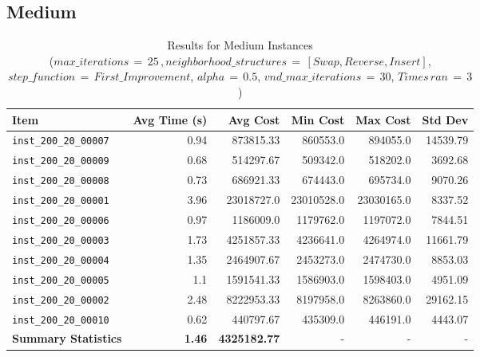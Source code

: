 \documentclass{article}
\begin{document}
\subsection*{Medium}
\begin{table}[H]
	\centering 
      \caption{Results for Medium Instances \\($max\_iterations \,{=}\, 25\,, neighborhood\_structures \,{=}\, [Swap, Reverse, Insert]$, $step\_function \,{=}\, First\_Improvement$, $alpha \,{=}\, 0.5$, $vnd\_max\_iterations \,{=}\, 30$, $Times\, ran \,{=}\, 3$)}
    \hspace*{-2cm}
	\begin{tabular}{lrrrrr} 
		\toprule 
		\textbf{Item} & \textbf{Avg Time (s)} & \textbf{Avg Cost} & \textbf{Min Cost} & \textbf{Max Cost} & \textbf{Std Dev} \\
		\midrule 
		\texttt{inst\_200\_20\_00007} & 0.94 & 873815.33 & 860553.0 & 894055.0 & 14539.79 \\ \texttt{inst\_200\_20\_00009} & 0.68 & 514297.67 & 509342.0 & 518202.0 & 3692.68 \\ \texttt{inst\_200\_20\_00008} & 0.73 & 686921.33 & 674443.0 & 695734.0 & 9070.26 \\ \texttt{inst\_200\_20\_00001} & 3.96 & 23018727.0 & 23010528.0 & 23030165.0 & 8337.52 \\ \texttt{inst\_200\_20\_00006} & 0.97 & 1186009.0 & 1179762.0 & 1197072.0 & 7844.51 \\ \texttt{inst\_200\_20\_00003} & 1.73 & 4251857.33 & 4236641.0 & 4264974.0 & 11661.79 \\ \texttt{inst\_200\_20\_00004} & 1.35 & 2464907.67 & 2453273.0 & 2474730.0 & 8853.03 \\ \texttt{inst\_200\_20\_00005} & 1.1 & 1591541.33 & 1586903.0 & 1598403.0 & 4951.09 \\ \texttt{inst\_200\_20\_00002} & 2.48 & 8222953.33 & 8197958.0 & 8263860.0 & 29162.15 \\ \texttt{inst\_200\_20\_00010} & 0.62 & 440797.67 & 435309.0 & 446191.0 & 4443.07 \\ \midrule \textbf{Summary Statistics} & \textbf{1.46} & \textbf{4325182.77} & - & - & - \\
		\bottomrule
	\end{tabular}
	\label{tab:performance_metrics_medium_grasp}
\end{table}
\end{document}
